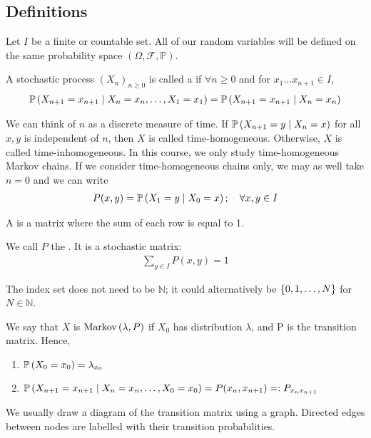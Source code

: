\subsection{Definitions}
Let $I$ be a finite or countable set.
All of our random variables will be defined on the same probability space $(\Omega, \mathcal F, \mathbb P)$.
\begin{definition}
	A stochastic process $(X_n)_{n \geq 0}$ is called a  if $\forall n \geq 0$ and for $x_1 \dots x_{n+1} \in I$,
	\begin{align*}
		\mathbb{P}\left({X_{n+1} = x_{n+1} \mid X_n = x_n, \dots,X_1 = x_1}\right) = \mathbb{P}\left({X_{n+1} = x_{n+1} \mid X_n = x_n}\right)
	\end{align*}
\end{definition}
\noindent We can think of $n$ as a discrete measure of time.
If $\mathbb{P}\left({X_{n+1} = y \mid X_n = x}\right)$ for all $x, y$ is independent of $n$, then $X$ is called time-homogeneous.
Otherwise, $X$ is called time-inhomogeneous.
In this course, we only study time-homogeneous Markov chains.
If we consider time-homogeneous chains only, we may as well take $n = 0$ and we can write
\begin{align*}
	P(x,y) = \mathbb{P}\left({X_1 = y \mid X_0 = x}\right);\quad \forall x,y \in I
\end{align*}
\begin{definition}
	A  is a matrix where the sum of each row is equal to 1.
\end{definition}
\noindent We call $P$ the .
It is a stochastic matrix:
\begin{align*}
	\sum_{y \in I} P(x,y) = 1
\end{align*}
\begin{remark}
	The index set does not need to be $\mathbb N$; it could alternatively be $\qty{0,1,\dots,N}$ for $N \in \mathbb N$.
\end{remark}
\noindent We say that $X$ is \(\operatorname{Markov}\left({\lambda, P}\right)\) if $X_0$ has distribution \(\lambda\), and P is the transition matrix.
Hence,
\begin{enumerate}
	\item $\mathbb{P}\left({X_0 = x_0}\right) = \lambda_{x_0}$
	\item $\mathbb{P}\left({X_{n+1} = x_{n+1} \mid X_n = x_n, \dots, X_0 = x_0}\right) = P(x_n, x_{n+1}) =: P_{x_n x_{n+1}}$
\end{enumerate}
We usually draw a diagram of the transition matrix using a graph.
Directed edges between nodes are labelled with their transition probabilities.

